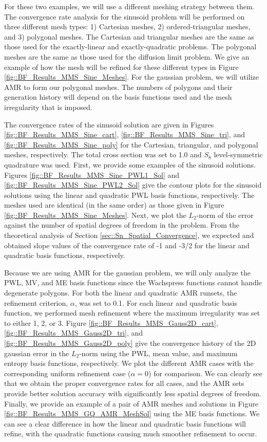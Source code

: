For these two examples, we will use a different meshing strategy between them. The convergence rate analysis for the sinusoid problem will be performed on three different mesh types: 1) Cartesian meshes, 2) ordered-triangular meshes, and 3) polygonal meshes. The Cartesian and triangular meshes are the same as those used for the exactly-linear and exactly-quadratic problems. The polygonal meshes are the same as those used for the diffusion limit problem. We give an example of how the mesh will be refined for these different types in Figure \ref{fig::BF_Results_MMS_Sine_Meshes}. For the gaussian problem, we will utilize AMR to form our polygonal meshes. The numbers of polygons and their generation history will depend on the basis functions used and the mesh irregularity that is imposed.

The convergence rates of the sinusoid solution are given in Figures \ref{fig::BF_Results_MMS_Sine_cart}, \ref{fig::BF_Results_MMS_Sine_tri}, and \ref{fig::BF_Results_MMS_Sine_poly} for the Cartesian, triangular, and polygonal meshes, respectively. The total cross section was set to 1.0 and $S_8$ level-symmetric quadrature was used. First, we provide some examples of the sinusoid solutions. Figures \ref{fig::BF_Results_MMS_Sine_PWL1_Sol} and \ref{fig::BF_Results_MMS_Sine_PWL2_Sol} give the contour plots for the sinusoid solutions using the linear and quadratic PWL basis functions, respectively. The meshes used are identical (in the same order) as those given in Figure \ref{fig::BF_Results_MMS_Sine_Meshes}. Next, we plot the $L_2$-norm of the error against the number of spatial degrees of freedom in the problem. From the theoretical analysis of Section \ref{sec::Sn_Spatial_Convergence}, we expected and obtained slope values of the convergence rate of -1 and -3/2 for the linear and quadratic basis functions, respectively. 

Because we are using AMR for the gaussian problem, we will only analyze the PWL, MV, and ME basis functions since the Wachspress functions cannot handle degenerate polygons. For both the linear and quadratic AMR runsets, the refinement criterion, $\alpha$, was set to 0.1. For each linear and quadratic basis function, we performed mesh refinement where the maximum irregularity was set to either 1, 2, or 3. Figure \ref{fig::BF_Results_MMS_Gauss2D_cart}, \ref{fig::BF_Results_MMS_Gauss2D_tri}, and \ref{fig::BF_Results_MMS_Gauss2D_poly} give the convergence history of the 2D gaussian error in the $L_2$-norm using the PWL, mean value, and maximum entropy basis functions, respectively. We plot the different AMR cases with the corresponding uniform refinement case ($\alpha=0$) for comparison. We can clearly see that we obtain the proper convergence rates for all cases, and the AMR sets provide better solution accuracy with significantly less spatial degrees of freedom. Finally, we provide an example of a pair of AMR meshes and solutions in Figure \ref{fig::BF_Results_MMS_GQ_AMR_MeshSol} using the ME basis functions. We can see a clear difference in how the linear and quadratic basis functions will refine, with the quadratic functions causing much smoother refinement to occur.

